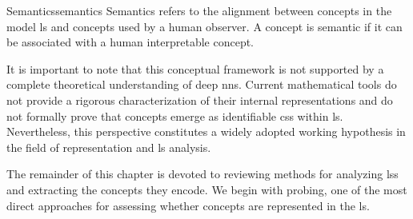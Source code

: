 \begin{definition}{Semantics}{semantics}
Semantics refers to the alignment between concepts in the model \gls{ls} and concepts used by a human observer.  
A concept is semantic if it can be associated with a human interpretable concept.  
\end{definition}

It is important to note that this conceptual framework is not supported by a complete theoretical understanding of deep \glspl{nn}.
Current mathematical tools do not provide a rigorous characterization of their internal representations and do not formally prove that concepts emerge as identifiable \glspl{cs} within \gls{ls}.
Nevertheless, this perspective constitutes a widely adopted working hypothesis in the field of representation and \gls{ls} analysis.

The remainder of this chapter is devoted to reviewing methods for analyzing \glspl{ls} and extracting the concepts they encode.
We begin with probing, one of the most direct approaches for assessing whether concepts are represented in the \gls{ls}.